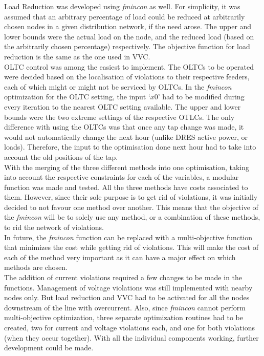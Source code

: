 Load Reduction was developed using \emph{fmincon} as well. For simplicity, it was assumed that an arbitrary percentage of load could be reduced at arbitrarily chosen nodes in a given distribution network, if the need arose. The upper and lower bounds were the actual load on the node, and the reduced load (based on the arbitrarily chosen percentage) respectively. The objective function for load reduction is the same as the one used in VVC.\\

OLTC control was among the easiest to implement. The OLTCs to be operated were decided based on the localisation of violations to their respective feeders, each of which might or might not be serviced by OLTCs. In the \emph{fmincon} optimization for the OLTC setting, the input `$x0$' had to be modified during every iteration to the nearest OLTC setting available. The upper and lower bounds were the two extreme settings of the respective OTLCs. The only difference with using the OLTCs was that once any tap change was made, it would not automatically change the next hour (unlike DRES active power, or loads). Therefore, the input to the optimisation done next hour had to take into account the old positions of the tap.\\

With the merging of the three different methods into one optimisation, taking into account the respective constraints for each of the variables, a modular function was made and tested. All the three methods have costs associated to them. However, since their sole purpose is to get rid of violations, it was initially decided to not favour one method over another. This means that the objective of the \emph{fmincon} will be to solely use any method, or a combination of these methods, to rid the network of violations.\\

In future, the \emph{fmincon} function can be replaced with a multi-objective function that minimizes the cost while getting rid of violations. This will make the cost of each of the method very important as it can have a major effect on which methods are chosen.\\

The addition of current violations required a few changes to be made in the functions. Management of voltage violations was still implemented with nearby nodes only. But load reduction and VVC had to be activated for all the nodes downstream of the line with overcurrent. Also, since \emph{fmincon} cannot perform multi-objective optimization, three separate optimization routines had to be created, two for current and voltage violations each, and one for both violations (when they occur together). With all the individual components working, further development could be made.

